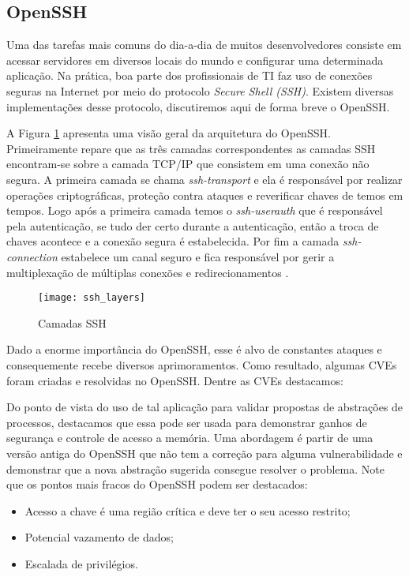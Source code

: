 \subsection{OpenSSH}

Uma das tarefas mais comuns do dia-a-dia de muitos desenvolvedores consiste em
acessar servidores em diversos locais do mundo e configurar uma determinada
aplicação. Na prática, boa parte dos profissionais de TI faz uso de conexões
seguras na Internet por meio do protocolo \textit{Secure Shell (SSH)}. Existem
diversas implementações desse protocolo, discutiremos aqui de forma breve o
OpenSSH.

A Figura \ref{fig:openssh_layer} apresenta uma visão geral da arquitetura do
OpenSSH. Primeiramente repare que as três camadas correspondentes as camadas
SSH encontram-se sobre a camada TCP/IP que consistem em uma conexão não segura.
A primeira camada se chama \textit{ssh-transport} e ela é responsável por
realizar operações criptográficas, proteção contra ataques e reverificar chaves
de temos em tempos. Logo após a primeira camada temos o \textit{ssh-userauth}
que é responsável pela autenticação, se tudo der certo durante a autenticação,
então a troca de chaves acontece e a conexão segura é estabelecida. Por fim a
camada \textit{ssh-connection} estabelece um canal seguro e fica responsável
por gerir a multiplexação de múltiplas conexões e redirecionamentos
\citep{proopenssh, opensshhood}.

\begin{figure}[!h]
  \centering
  \texttt{[image: ssh\_layers]}
  \caption{Camadas SSH \citep{opensshhood}}
  \label{fig:openssh_layer}
\end{figure}

Dado a enorme importância do OpenSSH, esse é alvo de constantes ataques e
consequemente recebe diversos aprimoramentos. Como resultado, algumas CVEs
foram criadas e resolvidas no OpenSSH. Dentre as CVEs destacamos:


Do ponto de vista do uso de tal aplicação para validar propostas de abstrações
de processos, destacamos que essa pode ser usada para demonstrar ganhos de
segurança e controle de acesso a memória. Uma abordagem é partir de uma versão
antiga do OpenSSH que não tem a correção para alguma vulnerabilidade e
demonstrar que a nova abstração sugerida consegue resolver o problema. Note que
os pontos mais fracos do OpenSSH podem ser destacados:

\begin{itemize}
  \item Acesso a chave é uma região crítica e deve ter o seu acesso restrito;
  \item Potencial vazamento de dados;
  \item Escalada de privilégios.
\end{itemize}

